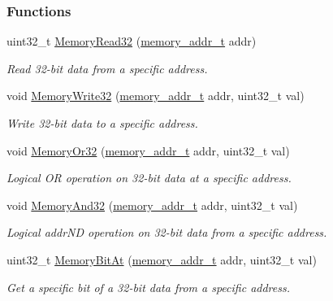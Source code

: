 \subsubsection*{Functions}
\begin{DoxyCompactItemize}
\item 
uint32\+\_\+t \mbox{\hyperlink{a00020_a706b02571285f92589fbb0b964d7d0bb}{Memory\+Read32}} (\mbox{\hyperlink{a00020_a06da901348542a481c297d9b700e2001}{memory\+\_\+addr\+\_\+t}} addr)
\begin{DoxyCompactList}\small\item\em Read 32-\/bit data from a specific address. \end{DoxyCompactList}\item 
void \mbox{\hyperlink{a00020_ad9953f631a539cfaa35baf94f878b3ec}{Memory\+Write32}} (\mbox{\hyperlink{a00020_a06da901348542a481c297d9b700e2001}{memory\+\_\+addr\+\_\+t}} addr, uint32\+\_\+t val)
\begin{DoxyCompactList}\small\item\em Write 32-\/bit data to a specific address. \end{DoxyCompactList}\item 
void \mbox{\hyperlink{a00020_a9ea92ebccdef6bdaca4d00210cc7266d}{Memory\+Or32}} (\mbox{\hyperlink{a00020_a06da901348542a481c297d9b700e2001}{memory\+\_\+addr\+\_\+t}} addr, uint32\+\_\+t val)
\begin{DoxyCompactList}\small\item\em Logical OR operation on 32-\/bit data at a specific address. \end{DoxyCompactList}\item 
void \mbox{\hyperlink{a00020_a5c1a2bd4c1bd4c2f429d8042a45327ff}{Memory\+And32}} (\mbox{\hyperlink{a00020_a06da901348542a481c297d9b700e2001}{memory\+\_\+addr\+\_\+t}} addr, uint32\+\_\+t val)
\begin{DoxyCompactList}\small\item\em Logical addr\+ND operation on 32-\/bit data from a specific address. \end{DoxyCompactList}\item 
uint32\+\_\+t \mbox{\hyperlink{a00020_aaa87daf3a7b5e127c21919e520e58282}{Memory\+Bit\+At}} (\mbox{\hyperlink{a00020_a06da901348542a481c297d9b700e2001}{memory\+\_\+addr\+\_\+t}} addr, uint32\+\_\+t val)
\begin{DoxyCompactList}\small\item\em Get a specific bit of a 32-\/bit data from a specific address. \end{DoxyCompactList}\item 

\end{DoxyCompactItemize}
